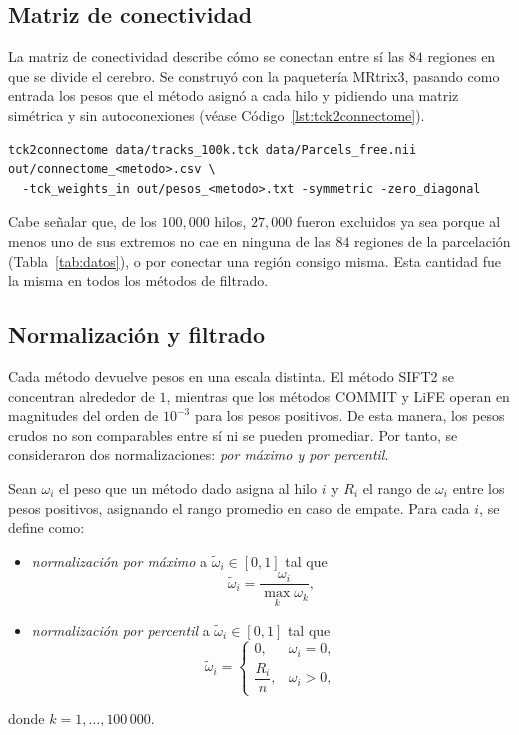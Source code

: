 \documentclass[11pt,a4paper]{article}
\begin{document}
\subsection{Matriz de conectividad}

La matriz de conectividad describe cómo se conectan entre sí las $84$ regiones en que se divide el cerebro. Se construyó con la paquetería MRtrix3, pasando como entrada los pesos que el método asignó a cada hilo y pidiendo una matriz simétrica y sin autoconexiones (véase Código~\ref{lst:tck2connectome}). 

\begin{lstlisting}[caption={Generación de matriz de conectividad}, label={lst:tck2connectome}]
tck2connectome data/tracks_100k.tck data/Parcels_free.nii out/connectome_<metodo>.csv \
  -tck_weights_in out/pesos_<metodo>.txt -symmetric -zero_diagonal
\end{lstlisting}

Cabe señalar que, de los $100,000$ hilos, $27,000$ fueron excluidos ya sea porque al menos uno de sus extremos no cae en ninguna de las $84$ regiones de la parcelación (Tabla~\ref{tab:datos}), o por conectar una región consigo misma. Esta cantidad fue la misma en todos los métodos de filtrado.

\subsection{Normalización y filtrado}
\label{sec:norm}

Cada método devuelve pesos en una escala distinta. El método SIFT2 se concentran alrededor de $1$, mientras que los métodos COMMIT y LiFE operan en magnitudes del orden de $10^{-3}$ para los pesos positivos. De esta manera, los pesos crudos no son comparables entre sí ni se pueden promediar. Por tanto, se consideraron dos normalizaciones: \textit{por máximo y por percentil}. 

\begin{tcolorbox}[colback=blue!5!white, colframe=blue!75!black, title= Normalización por máximo y normalización por percentil]
Sean $\omega_i$ el peso que un m\'etodo dado asigna al hilo $i$ y $R_i$ el rango de $\omega_i$ entre los pesos positivos, asignando el rango promedio en
caso de empate. Para cada $i$, se define como:
\begin{itemize}
    \item \textit{normalización por máximo} a $\tilde{\omega}_i\in [0, 1]$ tal que
\[
    \tilde{\omega}_i = \frac{\omega_i}{\max\limits_k \omega_k},
\]
    \item \textit{normalización por percentil} a $\tilde{\omega}_i\in[0,1]$ tal que
\[
    \tilde{\omega}_i =
    \begin{cases}
        0, & \omega_i = 0,\\[4pt]
        \dfrac{R_i}{n}, & \omega_i > 0,
    \end{cases}
\]
\end{itemize}

donde $k=1,\dots,100\,000$.
\end{tcolorbox} 
\end{document}
